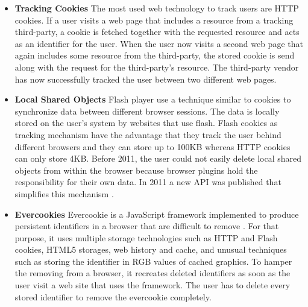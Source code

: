 %		
%		
	
	\begin{itemize}
		\item \textbf{Tracking Cookies} The most used web technology to track users are HTTP cookies. If a user visits a web page that includes a resource from a tracking third-party, a cookie is fetched together with the requested resource and acts as an identifier for the user. When the user now visits a second web page that again includes some resource from the third-party, the stored cookie is send along with the request for the third-party's resource. The third-party vendor has now successfully tracked the user between two different web pages.  
		
		\item \textbf{Local Shared Objects} Flash player use a technique similar to cookies to synchronize data between different browser sessions. The data is locally stored on the user's system by websites that use flash. Flash cookies as tracking mechanism have the advantage that they track the user behind different browsers and they can store up to 100KB whereas HTTP cookies can only store 4KB. Before 2011, the user could not easily delete local shared objects from within the browser because browser plugins hold the responsibility for their own data. In 2011 a new API was published that simplifies this mechanism \cite{mozillaWikiClearPrivacyAPI}. %
		
		\item \textbf{Evercookies} Evercookie is a JavaScript framework implemented to produce persistent identifiers in a browser that are difficult to remove \cite{evercookie}. For that purpose, it uses multiple storage technologies such as HTTP and Flash cookies, HTML5 storages, web history and cache, and unusual techniques such as storing the identifier in RGB values of cached graphics. To hamper the removing from a browser, it recreates deleted identifiers as soon as the user visit a web site that uses the framework. The user has to delete every stored identifier to remove the evercookie completely. 
	\end{itemize}
	
